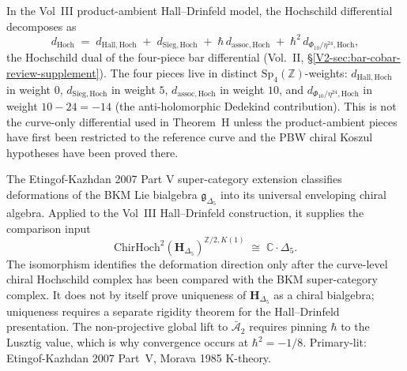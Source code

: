 \begin{remark}
\label{rem:chk-deep-2}
In the Vol~III product-ambient Hall--Drinfeld model, the Hochschild
differential decomposes as
\[
d_{\mathrm{Hoch}} \;=\; d_{\mathrm{Hall,Hoch}} \;+\; d_{\mathrm{Sieg,Hoch}} \;+\; \hbar\, d_{\mathrm{assoc,Hoch}} \;+\; \hbar^2\, d_{\Phi_{10}/\eta^{24},\mathrm{Hoch}},
\]
the Hochschild dual of the four-piece bar differential (Vol.~II,
\S\ref{V2-sec:bar-cobar-review-supplement}). The four pieces live in
distinct $\mathrm{Sp}_4(\mathbb Z)$-weights: $d_{\mathrm{Hall,Hoch}}$
in weight $0$, $d_{\mathrm{Sieg,Hoch}}$ in weight $5$,
$d_{\mathrm{assoc,Hoch}}$ in weight $10$, and
$d_{\Phi_{10}/\eta^{24},\mathrm{Hoch}}$ in weight $10 - 24 = -14$
(the anti-holomorphic Dedekind contribution). This is not the
curve-only differential used in Theorem~H unless the product-ambient
pieces have first been restricted to the reference curve and the
PBW chiral Koszul hypotheses have been proved there.
\end{remark}

\begin{remark}
\label{rem:chk-deep-3}
The Etingof-Kazhdan 2007 Part V super-category extension classifies
deformations of the BKM Lie bialgebra $\mathfrak g_{\Delta_5}$ into
its universal enveloping chiral algebra. Applied to the Vol~III
Hall--Drinfeld construction, it supplies the comparison input
\[
\mathrm{ChirHoch}^2(\mathbf H_{\Delta_5})^{\mathbb Z/2,K(1)}
\;\cong\; \mathbb C\cdot\Delta_5.
\]
The isomorphism identifies the deformation direction only after the
curve-level chiral Hochschild complex has been compared with the BKM
super-category complex. It does not by itself prove uniqueness of
$\mathbf H_{\Delta_5}$ as a chiral bialgebra; uniqueness requires a
separate rigidity theorem for the Hall--Drinfeld presentation. The
non-projective global lift to $\bar{\mathcal A}_2$ requires pinning
$\hbar$ to the
Lusztig value, which is why convergence occurs at $\hbar^2 = -1/8$.
Primary-lit: Etingof-Kazhdan 2007 Part~V, Morava 1985 K-theory.
\end{remark}
